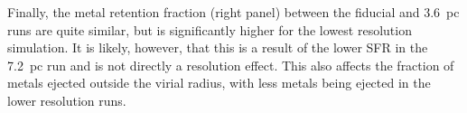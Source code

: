 \documentclass[fleqn,usenatbib,useAMS]{mnras}
\begin{document}
Finally, the metal retention fraction (right panel) between the fiducial and 3.6~pc runs are quite similar, but is significantly higher for the lowest resolution simulation. It is likely, however, that this is a result of the lower SFR in the 7.2~pc run and is not directly a resolution effect. This also affects the fraction of metals ejected outside the virial radius, with less metals being ejected in the lower resolution runs.



\label{lastpage}
\end{document}
